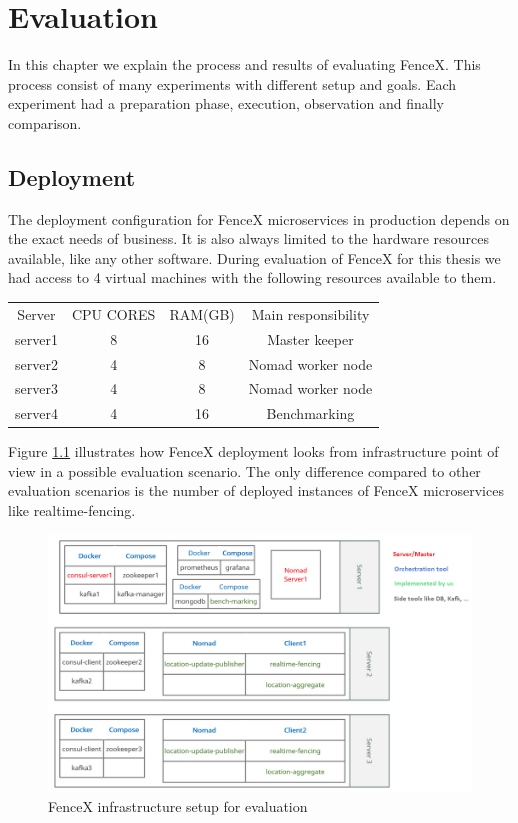 \documentclass[a4]{report}
\begin{document}
        \chapter{Evaluation}
        In this chapter we explain the process and results of evaluating FenceX.
        This process consist of many experiments with different setup and goals.
        Each experiment had a preparation phase, execution, observation and finally comparison.

        \section{Deployment}
        The deployment configuration for FenceX microservices in production depends on the exact needs of business.
        It is also always limited to the hardware resources available, like any other software.
        During evaluation of FenceX for this thesis we had access to 4 virtual machines with the following resources
        available to them.
        \begin{center}
            \begin{tabular}{ c c c c}
                Server  & CPU CORES & RAM(GB) & Main responsibility \\
                server1 & 8         & 16      & Master keeper       \\
                server2 & 4         & 8       & Nomad worker node   \\
                server3 & 4         & 8       & Nomad worker node   \\
                server4 & 4         & 16      & Benchmarking        \\
            \end{tabular}
        \end{center}


        Figure \ref{fig:infrastructure} illustrates how FenceX deployment looks from infrastructure point of view in a
        possible evaluation scenario.
        The only difference compared to other evaluation scenarios is the number of deployed instances of FenceX
        microservices like realtime-fencing.

        \begin{figure}[ht]
            \caption{FenceX infrastructure setup for evaluation}
            \label{fig:infrastructure}
            \includegraphics[scale=0.6]{images/Infrsutracture.png}
        \end{figure}
\end{document}
